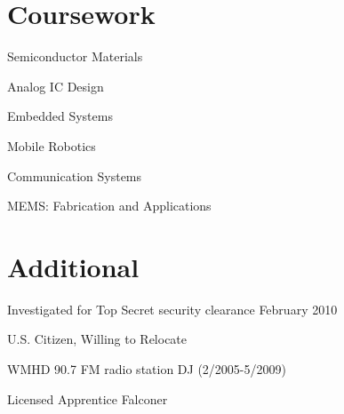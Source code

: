 \documentclass[11pt] {article}
\begin{document}
\section*{Coursework}
\begin{multicols}{2}
\begin{itemize*}
\item Semiconductor Materials
\item Analog IC Design
\item Embedded Systems
\item Mobile Robotics
\item Communication Systems
\item MEMS: Fabrication and Applications
\end{itemize*}
\end{multicols}

\section*{Additional}
\begin{itemize*}
\item Investigated for Top Secret security clearance February 2010
\item U.S. Citizen, Willing to Relocate
\item WMHD 90.7 FM radio station DJ (2/2005-5/2009)
\item Licensed Apprentice Falconer
\end{itemize*}
\thispagestyle{myheadings}
\end{document}
